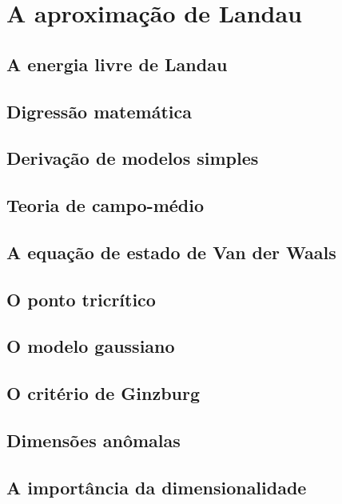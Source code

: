 \chapter{A aproxima\c{c}\~ao de Landau}
\noindent

\section{A energia livre de Landau}
\noindent

\section{Digress\~ao matem\'atica}
\noindent

\section{Deriva\c{c}\~ao de modelos simples}
\noindent

\section{Teoria de campo-m\'edio}
\noindent

\section{A equa\c{c}\~ao de estado de Van der Waals}
\noindent

\section{O ponto tricr\'itico}
\noindent

\section{O modelo gaussiano}
\noindent

\section{O crit\'erio de Ginzburg}
\noindent

\section{Dimens\~oes an\^omalas}
\noindent

\section{A import\^ancia da dimensionalidade}
\noindent